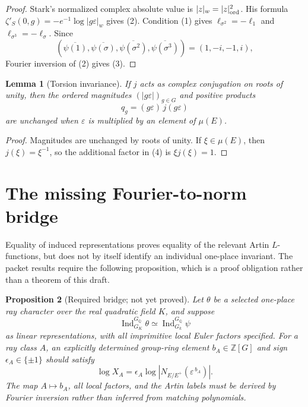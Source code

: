 \documentclass[11pt]{article}
\newtheorem{lemma}{Lemma}
\newtheorem{proposition}[lemma]{Proposition}
\newcommand{\Q}{\mathbb Q}
\begin{document}
\begin{proof}
Stark's normalized complex absolute value is
\(|z|_w=|z|_{\rm ord}^2\).  His formula
\(\zeta'_S(0,g)=-e^{-1}\log|g\varepsilon|_w\) gives (2).
Condition (1) gives
\(\ell_{\sigma^2}=-\ell_1\) and
\(\ell_{\sigma^3}=-\ell_\sigma\).  Since
\[
 (\overline{\psi(1)},\overline{\psi(\sigma)},
 \overline{\psi(\sigma^2)},\overline{\psi(\sigma^3)})
 =(1,-i,-1,i),
\]
Fourier inversion of (2) gives (3).
\end{proof}

\begin{lemma}[Torsion invariance]
If \(j\) acts as complex conjugation on roots of unity, then the
ordered magnitudes \((|g\varepsilon|)_{g\in G}\) and positive products
\[
 q_g=(g\varepsilon)\,j(g\varepsilon)
\tag{4}
\]
are unchanged when \(\varepsilon\) is multiplied by an element of
\(\mu(E)\).
\end{lemma}

\begin{proof}
Magnitudes are unchanged by roots of unity.  If
\(\xi\in\mu(E)\), then \(j(\xi)=\xi^{-1}\), so the additional factor
in (4) is \(\xi j(\xi)=1\).
\end{proof}

\section{The missing Fourier-to-norm bridge}

Equality of induced representations proves equality of the relevant
Artin \(L\)-functions, but does not by itself identify an individual
one-place invariant.  The packet results require the following
proposition, which is a proof obligation rather than a theorem of this
draft.

\begin{proposition}[Required bridge; not yet proved]\label{prop:bridge}
Let \(\theta\) be a selected one-place ray character over the real
quadratic field \(K\), and suppose
\[
 \operatorname{Ind}_{G_K}^{G_\Q}\theta
 \simeq
 \operatorname{Ind}_{G_k}^{G_\Q}\psi
\tag{5}
\]
as linear representations, with all imprimitive local Euler factors
specified.  For a ray class \(A\), an explicitly determined
group-ring element \(b_A\in\mathbb Z[G]\) and sign
\(\epsilon_A\in\{\pm1\}\) should satisfy
\[
 \log X_A
 =\epsilon_A\log\left|
 N_{E/E^+}\!\left(\varepsilon^{\,b_A}\right)\right|.
\tag{6}
\]
The map \(A\mapsto b_A\), all local factors, and the Artin labels must
be derived by Fourier inversion rather than inferred from matching
polynomials.
\end{proposition}
\end{document}
